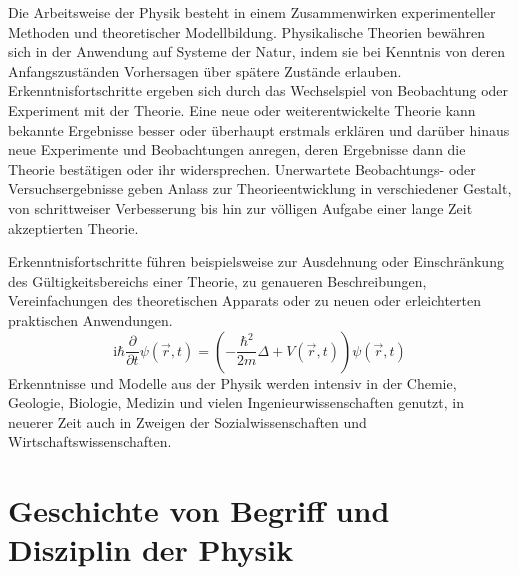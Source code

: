 \documentclass[titlepage, parkskip=full, twocolumn, landscape]{scrartcl}
\begin{document}
Die Arbeitsweise der Physik besteht in einem Zusammenwirken experimenteller Methoden und theoretischer Modellbildung. Physikalische Theorien bewähren sich in der Anwendung auf Systeme der Natur, indem sie bei Kenntnis von deren Anfangszuständen Vorhersagen über spätere Zustände erlauben. Erkenntnisfortschritte ergeben sich durch das Wechselspiel von Beobachtung oder Experiment mit der Theorie. Eine neue oder weiterentwickelte Theorie kann bekannte Ergebnisse besser oder überhaupt erstmals erklären und darüber hinaus neue Experimente und Beobachtungen anregen, deren Ergebnisse dann die Theorie bestätigen oder ihr widersprechen. Unerwartete Beobachtungs- oder Versuchsergebnisse geben Anlass zur Theorieentwicklung in verschiedener Gestalt, von schrittweiser Verbesserung bis hin zur völligen Aufgabe einer lange Zeit akzeptierten Theorie.

Erkenntnisfortschritte führen beispielsweise zur Ausdehnung oder Einschränkung des Gültigkeitsbereichs einer Theorie, zu genaueren Beschreibungen, Vereinfachungen des theoretischen Apparats oder zu neuen oder erleichterten praktischen Anwendungen.
\begin{equation}
	\mathrm{i}\hbar\frac{\partial}{\partial t} \psi(\vec{r},t) = \left(-\frac{\hbar^2}{2m}\Delta + V(\vec{r},t)\right) \psi(\vec{r},t) \label{eq:schrödinger}
\end{equation}
Erkenntnisse und Modelle aus der Physik werden intensiv in der Chemie, Geologie, Biologie, Medizin und vielen Ingenieurwissenschaften genutzt, in neuerer Zeit auch in Zweigen der Sozialwissenschaften und Wirtschaftswissenschaften.

\section{Geschichte von Begriff und Disziplin der Physik}
\end{document}
